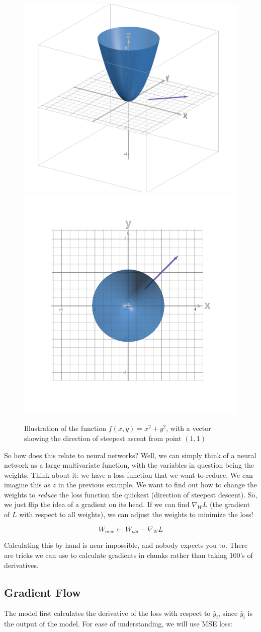     \begin{figure}[H]
        \centering
        \includegraphics[width=0.45\linewidth]{dl/x2y2line.png}
        \includegraphics[width=0.45\linewidth]{dl/x2y2lineabove.png}
        \caption{Illustration of the function $f(x, y) = x^2 + y^2$, with a vector showing the direction of steepest ascent from point $(1,1)$}
        \label{fig:x2y2_2}
    \end{figure}

    So how does this relate to neural networks? Well, we can simply think of a neural network as a large multivariate function, with the variables in question being the weights. Think about it: we have a loss function that we want to reduce. We can imagine this as $z$ in the previous example. We want to find out how to change the weights to \textit{reduce} the loss function the quickest (direction of steepest descent). So, we just flip the idea of a gradient on its head. If we can find $\nabla_W L$ (the gradient of $L$ with respect to all weights), we can adjust the weights to minimize the loss!

    $$W_{new} \leftarrow W_{old} - \nabla_W L$$

    Calculating this by hand is near impossible, and nobody expects you to. There are tricks we can use to calculate gradients in chunks rather than taking 100's of derivatives.

\subsection{Gradient Flow}
    \large The model first calculates the derivative of the loss with respect to $\hat{y}_i$, since $\hat{y}_i$ is the output of the model. For ease of understanding, we will use MSE loss:

